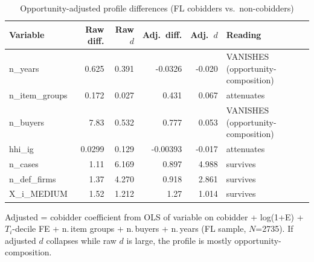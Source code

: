 \begin{table}[htbp]\centering\footnotesize
\caption{Opportunity-adjusted profile differences (FL cobidders vs.\ non-cobidders)}
\label{tab:opp_adjusted_profile}
\begin{tabular}{lrrrrl}\hline
Variable & Raw diff. & Raw $d$ & Adj.\ diff. & Adj.\ $d$ & Reading \\\hline
n\_years & 0.625 & 0.391 & -0.0326 & -0.020 & VANISHES (opportunity-composition) \\
n\_item\_groups & 0.172 & 0.027 & 0.431 & 0.067 & attenuates \\
n\_buyers & 7.83 & 0.532 & 0.777 & 0.053 & VANISHES (opportunity-composition) \\
hhi\_ig & 0.0299 & 0.129 & -0.00393 & -0.017 & attenuates \\
n\_cases & 1.11 & 6.169 & 0.897 & 4.988 & survives \\
n\_def\_firms & 1.37 & 4.270 & 0.918 & 2.861 & survives \\
X\_i\_MEDIUM & 1.52 & 1.212 & 1.27 & 1.014 & survives \\
\hline\end{tabular}
\begin{tablenotes}\footnotesize\item Adjusted = cobidder coefficient from OLS of variable on cobidder + log(1+E) + $T_i$-decile FE + n.\,item groups + n.\,buyers + n.\,years (FL sample, $N$=2735). If adjusted $d$ collapses while raw $d$ is large, the profile is mostly opportunity-composition.\end{tablenotes}
\end{table}
